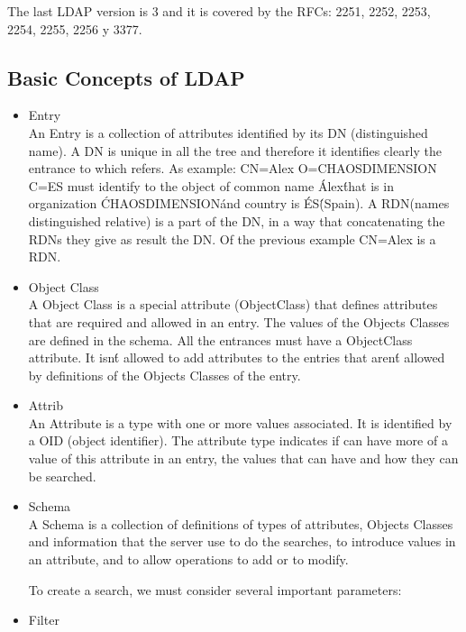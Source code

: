 The last LDAP version is 3 and it is covered by the RFCs: 2251\cite{2251}, 2252\cite{2252}, 2253\cite{2253}, 2254\cite{2254}, 2255\cite{2255}, 2256\cite{2256} y 3377\cite{3377}.\\
\newpage
\subsection{Basic Concepts of LDAP}

\begin{itemize}
\item[]Entry\\
An Entry is a collection of attributes identified by its DN (distinguished name). A DN is unique in all the tree and therefore it identifies clearly the entrance to which refers. As example: CN=Alex O=CHAOSDIMENSION C=ES must identify to the object of common name \'Alex\' that is in organization \'CHAOSDIMENSION\' and country is \'ES\' (Spain). A RDN(names distinguished relative) is a part of the DN, in a way that concatenating the RDNs they give as result the DN. Of the previous example  CN=Alex is a RDN.

\item[]Object Class\\
A Object Class is a special attribute (ObjectClass) that defines attributes that are required and allowed in an entry. The values of the Objects Classes are defined in the schema. All the entrances must have a ObjectClass attribute. It isn\'t allowed to add attributes to the entries that aren\'t allowed by definitions of the Objects Classes of the entry.

\item[]Attrib\\
An Attribute is a type with one or more values associated. It is identified by a OID (object identifier). The attribute type indicates if can have more of a value of this attribute in an entry, the values that can have and how they can be searched.

\item[]Schema\\
A Schema is a collection of definitions of types of attributes, Objects Classes  and information that the server use to do the searches, to introduce values in an attribute, and to allow operations to add or to modify.

To create a search, we must consider several important parameters:
\item[]Filter\\
\end{itemize}
